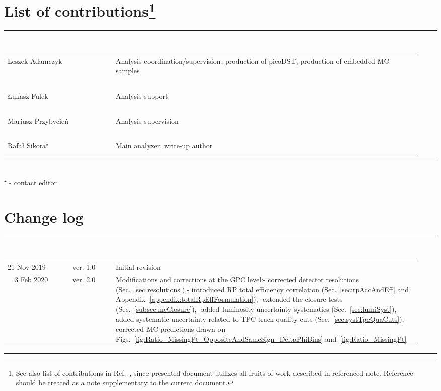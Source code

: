 \section*{\LARGE List of contributions\footnote{See also list of contributions in Ref.~\cite{supplementaryNote}, since presented document utilizes all fruits of work described in referenced note. Reference~\cite{supplementaryNote} should be treated as a note supplementary to the current document.}}%
%
   \rule{\textwidth}{1.0pt}\\[5pt]%
      \begin{tabular}{>{\raggedright}p{0.25\linewidth}p{0.7\linewidth}}
		Leszek Adamczyk & Analysis coordination/supervision, production of picoDST, production of embedded MC samples\\
		~&~\\
		Łukasz Fulek & Analysis support\\
		~&~\\
		Mariusz Przybycień & Analysis supervision\\
		~&~\\
        Rafał Sikora$^{\star}$  & Main analyzer, write-up author\\
      \end{tabular}\newline
   \rule{\textwidth}{1.0pt}\\[10pt]%
   $^{\star}$ - contact editor
   \\[50pt]%
\section*{\LARGE Change log}%
%
  \rule{\textwidth}{1.0pt}\\[5pt]%
  \begin{tabular}{>{\raggedright}p{0.15\linewidth}p{0.1\linewidth}p{0.7\linewidth}}
  	21 Nov 2019 & ver. 1.0 & Initial revision\\
  	~~3 Feb 2020 & ver. 2.0 & Modifications and corrections at the GPC level:\newline- corrected detector resolutions (Sec.~\ref{sec:resolutions}),\newline- introduced RP total efficiency correlation (Sec.~\ref{sec:rpAccAndEff} and Appendix~\ref{appendix:totalRpEffFormulation}),\newline- extended the closure tests (Sec.~\ref{subsec:mcClosure}),\newline- added luminosity uncertainty systematics (Sec.~\ref{sec:lumiSyst}),\newline- added systematic uncertainty related to TPC track quality cuts (Sec.~\ref{sec:systTpcQuaCuts}),\newline- corrected MC predictions drawn on Figs.~\ref{fig:Ratio_MissingPt_OppositeAndSameSign_DeltaPhiBins} and~\ref{fig:Ratio_MissingPt}
  \end{tabular}\newline%
 \rule{\textwidth}{1.0pt}
